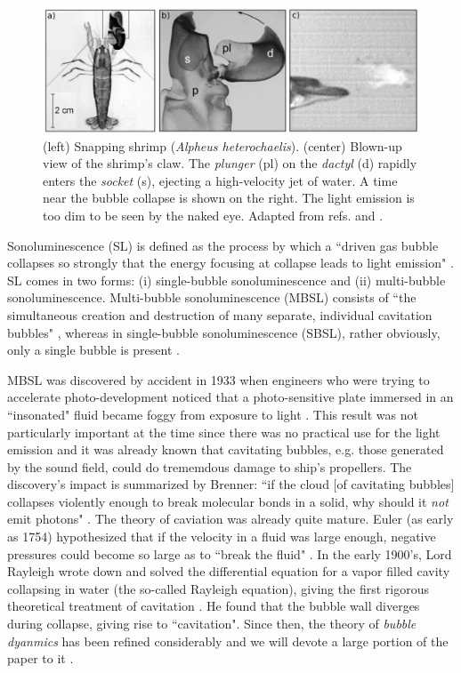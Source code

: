 \documentclass[11pt,prb,aps,nofootinbib,superscriptaddress,floatfix]{revtex4-2}
\begin{document}
\begin{figure}
\includegraphics[width=0.9\linewidth]{figs/shrimp.pdf}
    \caption{(left) Snapping shrimp (\emph{Alpheus heterochaelis}). (center) Blown-up view of the shrimp's claw. The \emph{plunger} (pl) on the \emph{dactyl} (d) rapidly enters the \emph{socket} (s), ejecting a high-velocity jet of water. A time near the bubble collapse is shown on the right. The light emission is too dim to be seen by the naked eye. Adapted from refs. \cite{versluis2000snapping} and \cite{lohse2001snapping}.}
\label{fig:shrimp}
\end{figure}

Sonoluminescence (SL) is defined as the process by which a ``driven gas bubble collapses so strongly that the energy focusing at collapse leads to light emission" \cite{brenner2002single}. SL comes in two forms: (i) single-bubble sonoluminescence and (ii) multi-bubble sonoluminescence. Multi-bubble sonoluminescence (MBSL) consists of  ``the simultaneous creation and destruction of many separate, individual cavitation bubbles" \cite{crum1994sonoluminescence,brenner2002single}, whereas in single-bubble sonoluminescence (SBSL), rather obviously, only a single bubble is present \cite{gaitan1992sonoluminescence}. 

MBSL was discovered by accident in 1933 when engineers who were trying to accelerate photo-development noticed that a photo-sensitive plate immersed in an ``insonated" fluid became foggy from exposure to light \cite{marinesco1933actions,frenzel1934luminescenz}. This result was not particularly important at the time since there was no practical use for the light emission and it was already known that cavitating bubbles, e.g. those generated by the sound field, could do trememdous damage to ship's propellers. The discovery's impact is summarized by Brenner: ``if the cloud [of cavitating bubbles] collapses violently enough to break molecular bonds in a solid, why should it \emph{not} emit photons" \cite{brenner2002single}. The theory of caviation was already quite mature. Euler (as early as 1754) hypothesized that if the velocity in a fluid was large enough, negative pressures could become so large as to ``break the fluid" \cite{li2015introduction,gaitan1992sonoluminescence}. In the early 1900's, Lord Rayleigh wrote down and solved the differential equation for a vapor filled cavity collapsing in water (the so-called Rayleigh equation), giving the first rigorous theoretical treatment of cavitation \cite{rayleigh1917pressure,plesset1977bubble}. He found that the bubble wall diverges during collapse, giving rise to ``cavitation". Since then, the theory of \emph{bubble dyanmics} has been refined considerably and we will devote a large portion of the paper to it \cite{prosperetti1999old,plesset1977bubble,plesset1977bubble,brenner2002single,lofstedt1995sonoluminescing,barber1992resolving}. 
\end{document}
